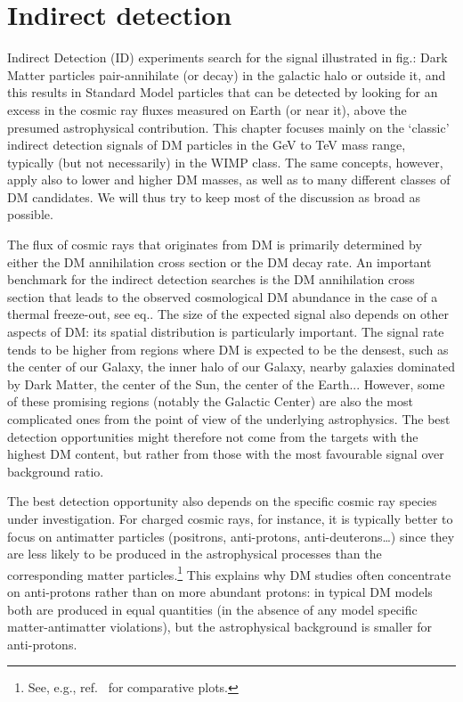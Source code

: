 \chapter{Indirect detection}
\label{chapter:indirect}

Indirect Detection (ID) experiments search for the signal illustrated in fig.:
Dark Matter particles pair-annihilate (or decay) in the galactic halo or outside it, and this results in Standard Model particles that can be detected by looking for an excess in the cosmic ray fluxes measured on Earth (or near it), above the presumed astrophysical contribution. 
This chapter focuses mainly on the `classic' indirect detection signals of
DM particles in the GeV to TeV mass range, typically (but not necessarily) in the WIMP class. 
The same concepts, however,  apply also to lower and higher DM masses, as well as to many different classes of DM candidates. 
We will thus try to keep most of the discussion as broad as possible.

\medskip

The flux of cosmic rays that originates from DM is primarily determined by either the DM annihilation cross section or the DM decay rate. 
An important benchmark for the indirect detection searches is the DM annihilation cross section that leads to the observed cosmological
DM abundance in the case of a thermal freeze-out, see
eq..
The size of the expected signal also depends on other aspects of DM: its spatial distribution is particularly important.
The signal rate tends to be higher from regions where DM is expected to be the densest, such as the center of our Galaxy, the inner halo of our Galaxy, nearby galaxies dominated by Dark Matter, the center of the Sun, the center of the Earth...  
However, some of these promising regions (notably the Galactic Center) are also the most complicated ones from the point of view of the underlying astrophysics.
The best detection opportunities might therefore not come from the targets with the highest DM content,
but rather from those with the most favourable signal over background ratio.

The best detection opportunity also depends on the specific cosmic ray species under investigation.
For charged cosmic rays, for instance, it is typically better to focus on antimatter particles (positrons, anti-protons, anti-deuterons\ldots) since they are less likely to be produced in the astrophysical processes 
than the corresponding matter particles.\footnote{See, e.g., ref.~\cite{galCRplots} for comparative plots.} 
This explains why DM studies often concentrate on anti-protons rather than on more  abundant protons: in typical DM models both are produced in equal quantities (in the absence of any model specific matter-antimatter violations), but the astrophysical background is smaller for anti-protons. 

